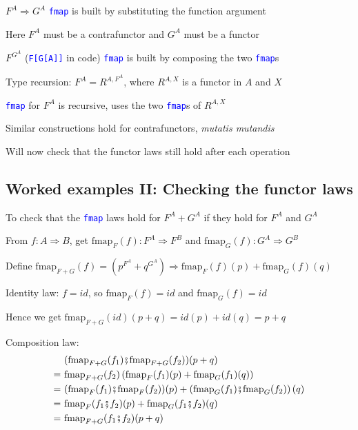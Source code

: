 $F^{A}\Rightarrow G^{A}$ \textendash{} \texttt{\textcolor{blue}{\footnotesize{}fmap}}
is built by substituting the function argument

Here $F^{A}$ must be a contrafunctor and $G^{A}$ must be a functor

$F^{G^{A}}$ (\texttt{\textcolor{blue}{\footnotesize{}F{[}G{[}A{]}{]}}}
in code) \textendash{} \texttt{\textcolor{blue}{\footnotesize{}fmap}}
is built by composing the two \texttt{\textcolor{blue}{\footnotesize{}fmap}}s

Type recursion: $F^{A}=R^{A,F^{A}}$, where $R^{A,X}$ is a functor
in $A$ and $X$

\texttt{\textcolor{blue}{\footnotesize{}fmap}} for $F^{A}$ is recursive,
uses the two \texttt{\textcolor{blue}{\footnotesize{}fmap}}s of $R^{A,X}$

Similar constructions hold for contrafunctors, \emph{mutatis mutandis}

Will now check that the functor laws still hold after each operation


\subsection{Worked examples II: Checking the functor laws}

To check that the \texttt{\textcolor{blue}{\footnotesize{}fmap}} laws
hold for $F^{A}+G^{A}$ if they hold for $F^{A}$ and $G^{A}$

From $f:A\Rightarrow B$, get $\text{fmap}_{F}(f):F^{A}\Rightarrow F^{B}$
and $\text{fmap}_{G}(f):G^{A}\Rightarrow G^{B}$

Define $\text{fmap}_{F+G}(f)=(p^{F^{A}}+q^{G^{A}})\Rightarrow\text{fmap}_{F}(f)(p)+\text{fmap}_{G}(f)(q)$

Identity law: $f=id$, so $\text{fmap}_{F}(f)=id$ and $\text{fmap}_{G}(f)=id$

Hence we get $\text{fmap}_{F+G}(id)(p+q)=id(p)+id(q)=p+q$

Composition law: 
\begin{align*}
 & (\text{fmap}_{F+G}(f_{1})\bef\text{fmap}_{F+G}(f_{2}))(p+q)\\
=\  & \text{fmap}_{F+G}(f_{2})\left(\text{fmap}_{F}(f_{1})(p)+\text{fmap}_{G}(f_{1})(q)\right)\\
=\  & (\text{fmap}_{F}(f_{1})\bef\text{fmap}_{F}(f_{2}))(p)+\left(\text{fmap}_{G}(f_{1})\bef\text{fmap}_{G}(f_{2})\right)(q)\\
=\  & \text{fmap}_{F}(f_{1}\bef f_{2})(p)+\text{fmap}_{G}(f_{1}\bef f_{2})(q)\\
=\  & \text{fmap}_{F+G}(f_{1}\bef f_{2})(p+q)
\end{align*}

